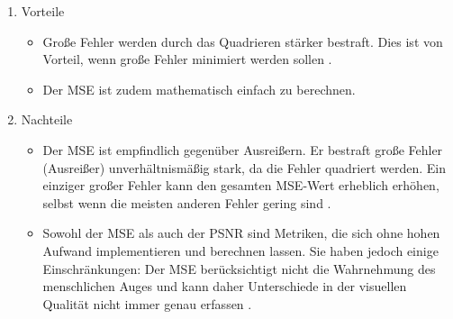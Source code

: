             \begin{enumerate}
                \item Vorteile
                \begin{itemize}
                    \item Große Fehler werden durch das Quadrieren stärker bestraft. Dies ist von Vorteil, wenn große Fehler minimiert werden sollen \cite{mse_builtin}.
                    \item Der MSE ist zudem mathematisch einfach zu berechnen.
                \end{itemize}
                \item Nachteile
                \begin{itemize}
                    \item Der MSE ist empfindlich gegenüber Ausreißern. Er bestraft große Fehler (Ausreißer) unverhältnismäßig stark, da die Fehler quadriert werden. Ein einziger großer Fehler kann den gesamten MSE-Wert erheblich erhöhen, selbst wenn die meisten anderen Fehler gering sind \cite{mse_builtin}.
                    \item             
                    Sowohl der MSE als auch der PSNR sind Metriken, die sich ohne hohen Aufwand
                    implementieren und berechnen lassen. Sie haben jedoch einige Einschränkungen: Der
                    MSE berücksichtigt nicht die Wahrnehmung des menschlichen Auges und kann daher
                    Unterschiede in der visuellen Qualität nicht immer genau erfassen \cite{mse_psnr_eye}.
                \end{itemize}
            \end{enumerate}

\newpage
